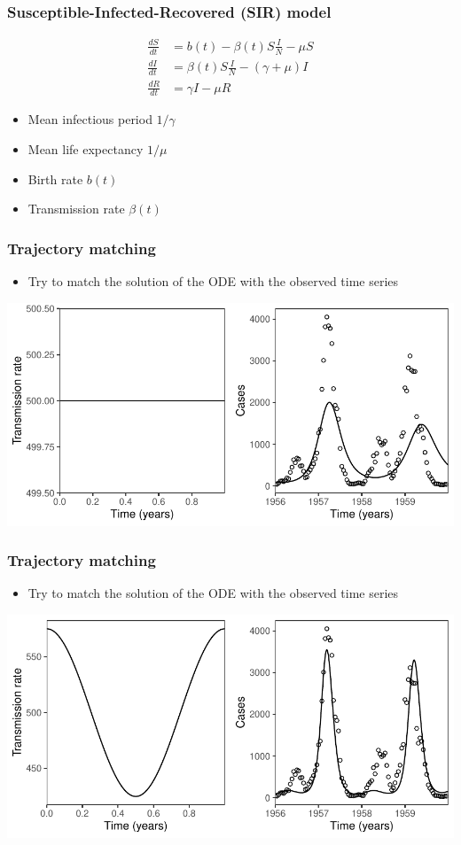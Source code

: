 \documentclass{beamer}
\begin{document}
\begin{frame}
\frametitle{Susceptible-Infected-Recovered (SIR) model}
$$
\begin{aligned}
\frac{dS}{dt} &= b(t) - \beta(t) S \frac{I}{N} - \mu S\\
\frac{dI}{dt} &= \beta(t) S \frac{I}{N} - (\gamma + \mu) I\\
\frac{dR}{dt} &= \gamma I - \mu R
\end{aligned}
$$
\begin{itemize}
	\item Mean infectious period $1/\gamma$
	\item Mean life expectancy $1/\mu$
	\item Birth rate $b(t)$
	\item Transmission rate $\beta(t)$
\end{itemize}
\end{frame}

\begin{frame}
\frametitle{Trajectory matching}
\begin{itemize}
	\item Try to match the solution of the ODE with the observed time series
\end{itemize}
\begin{center}
\includegraphics[width=\textwidth]{traj1.pdf}
\end{center}
\end{frame}

\begin{frame}
\frametitle{Trajectory matching}
\begin{itemize}
	\item Try to match the solution of the ODE with the observed time series
\end{itemize}
\begin{center}
\includegraphics[width=\textwidth]{traj2.pdf}
\end{center}
\end{frame}
\end{document}
